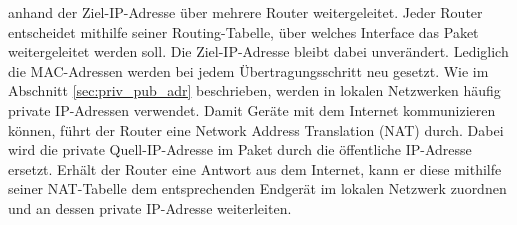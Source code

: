 	anhand der Ziel-IP-Adresse über mehrere Router weitergeleitet. Jeder Router
	entscheidet mithilfe seiner Routing-Tabelle, über welches Interface das
	Paket weitergeleitet werden soll. Die Ziel-IP-Adresse bleibt dabei unverändert.
	Lediglich die MAC-Adressen werden bei jedem Übertragungsschritt neu gesetzt.
	Wie im Abschnitt \ref{sec:priv_pub_adr} beschrieben, werden in lokalen 
	Netzwerken häufig private IP-Adressen verwendet. Damit Geräte mit dem Internet 
	kommunizieren können, führt der Router eine Network Address Translation (NAT) 
	durch. Dabei wird die private Quell-IP-Adresse im Paket durch die öffentliche 
	IP-Adresse ersetzt. Erhält der Router eine Antwort aus dem Internet, kann er
	diese mithilfe seiner NAT-Tabelle dem entsprechenden Endgerät im lokalen 
	Netzwerk zuordnen und an dessen private IP-Adresse weiterleiten.
	\cite{zisler2022, baun2025}

